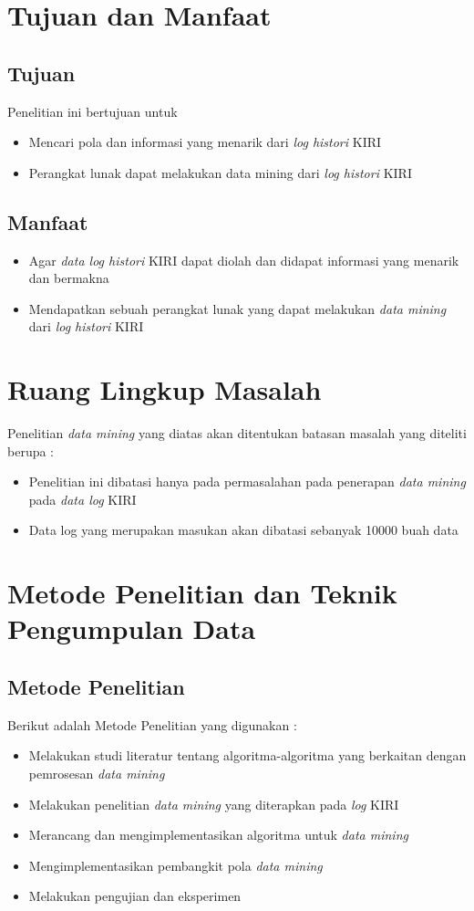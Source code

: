 \section{Tujuan dan Manfaat}
\subsection{Tujuan}
Penelitian ini bertujuan untuk 
\begin{itemize}
	\item Mencari pola dan informasi yang menarik dari \textsl{log histori} KIRI
	\item Perangkat lunak dapat melakukan data mining dari \textsl{log histori} KIRI
\end{itemize}
\subsection{Manfaat}
\begin{itemize}
	\item Agar \textsl{data log histori} KIRI dapat diolah dan didapat informasi yang menarik dan bermakna
	\item Mendapatkan sebuah perangkat lunak yang dapat melakukan \textsl{data mining} dari \textsl{log histori} KIRI
\end{itemize}

\section{Ruang Lingkup Masalah}
Penelitian \textsl{data mining} yang diatas akan ditentukan batasan masalah yang diteliti berupa : 
\begin{itemize}
	\item Penelitian ini dibatasi hanya pada permasalahan pada penerapan \textsl{data mining} pada \textsl{data log} KIRI
	\item Data log yang merupakan masukan akan dibatasi sebanyak 10000 buah data
\end{itemize}

\section{Metode Penelitian dan Teknik Pengumpulan Data}
\subsection{Metode Penelitian}
Berikut adalah Metode Penelitian yang digunakan : 
	\begin{itemize}
		\item Melakukan studi literatur tentang algoritma-algoritma yang berkaitan dengan pemrosesan \textsl{data mining}
		\item Melakukan penelitian \textsl{data mining} yang diterapkan pada \textsl{log} KIRI
		\item Merancang dan mengimplementasikan algoritma untuk \textsl{data mining}
		\item Mengimplementasikan pembangkit pola \textsl{data mining}
		\item Melakukan pengujian dan eksperimen
	\end{itemize}
